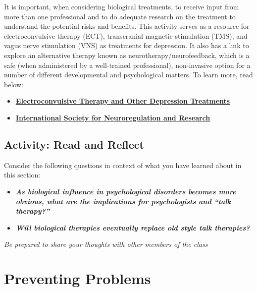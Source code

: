 \documentclass[
]{book}
\providecommand{\tightlist}{%
  \setlength{\itemsep}{0pt}\setlength{\parskip}{0pt}}
\begin{document}
\begin{reflect}
It is important, when considering biological treatments, to receive input from more than one professional and to do adequate research on the treatment to understand the potential risks and benefits. This activity serves as a resource for electroconvulsive therapy (ECT), transcranial magnetic stimulation (TMS), and vagus nerve stimulation (VNS) as treatments for depression. It also has a link to explore an alternative therapy known as neurotherapy/neurofeedback, which is a safe (when administered by a well-trained professional), non-invasive option for a number of different developmental and psychological matters. To learn more, read below:

\begin{itemize}
\tightlist
\item
  \href{https://www.camh.ca/en/health-info/mental-illness-and-addiction-index/electroconvulsive-therapy}{\textbf{Electroconvulsive Therapy and Other Depression Treatments}}
\item
  \href{https://isnr.org/}{\textbf{International Society for Neuroregulation and Research}}
\end{itemize}
\end{reflect}

\hypertarget{activity-read-and-reflect-23}{%
\subsection*{Activity: Read and Reflect}\label{activity-read-and-reflect-23}}

\begin{reflect}
Consider the following questions in context of what you have learned about in this section:

\begin{itemize}
\tightlist
\item
  \textbf{\emph{As biological influence in psychological disorders becomes more obvious, what are the implications for psychologists and ``talk therapy?''}}
\item
  \textbf{\emph{Will biological therapies eventually replace old style talk therapies?}}
\end{itemize}

\emph{Be prepared to share your thoughts with other members of the class}
\end{reflect}

\hypertarget{preventing-problems}{%
\section{Preventing Problems}\label{preventing-problems}}
\end{document}
